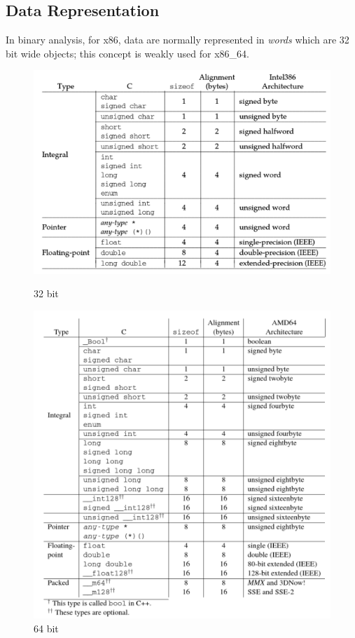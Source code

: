 \subsection{Data Representation}
In binary analysis, for x86, data are normally represented in \textit{words} which are 32 bit wide objects; this concept
is weakly used for x86\_64.
\begin{figure}[!h]
    \centering
    \begin{minipage}[t]{4cm}
        \centering
        \includegraphics[scale=0.4]{./pics/i386_data.png}
        \caption{32 bit}
    \end{minipage}
    \hspace{5cm}
    \begin{minipage}[t]{4cm}
        \centering
        \includegraphics[scale=0.4]{./pics/amd64_data.png}
        \caption{64 bit}
    \end{minipage}
\end{figure}

